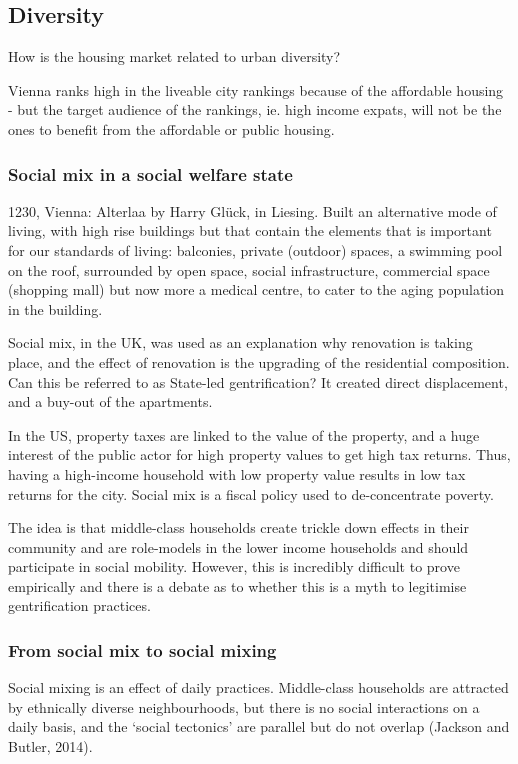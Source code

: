 \documentclass{article}
\begin{document}
\subsection{Diversity}

How is the housing market related to urban diversity?

Vienna ranks high in the liveable city rankings because of the affordable housing - but the target audience of the rankings, ie. high income expats, will not be the ones to benefit from the affordable or public housing.

\subsubsection{Social mix in a social welfare state}

1230, Vienna: Alterlaa by Harry Glück, in Liesing. Built an alternative mode of living, with high rise buildings but that contain the elements that is important for our standards of living: balconies, private (outdoor) spaces, a swimming pool on the roof, surrounded by open space,  social infrastructure, commercial space (shopping mall) but now more a medical centre, to cater to the aging population in the building.

Social mix, in the UK, was used as an explanation why renovation is taking place, and the effect of renovation is the upgrading of the residential composition. Can this be referred to as State-led gentrification? It created direct displacement, and a buy-out of the apartments.

In the US, property taxes are linked to the value of the property, and a huge interest of the public actor for high property values to get high tax returns. Thus, having a high-income household with low property value results in low tax returns for the city. Social mix is a fiscal policy used to de-concentrate poverty.

The idea is that middle-class households create trickle down effects in their community and are role-models in the lower income households and should participate in social mobility. However, this is incredibly difficult to prove empirically and there is a debate as to whether this is a myth to legitimise gentrification practices.

\subsubsection{From social mix to social mixing}

Social mixing is an effect of daily practices. 
Middle-class households are attracted by ethnically diverse neighbourhoods, but there is no social interactions on a daily basis, and the `social tectonics' are parallel but do not overlap (Jackson and Butler, 2014).
\end{document}
